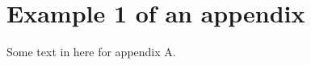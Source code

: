 
\chapter{Example 1 of an appendix}\label{How_to_use_OpenDA_models}

Some text in here for appendix A.